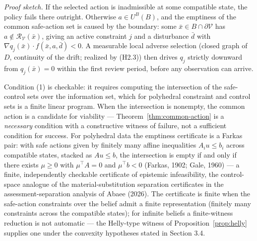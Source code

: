 \documentclass[10pt,twocolumn]{article}
\theoremstyle{definition}
\begin{document}
\emph{Proof sketch.} If the selected action is inadmissible at some compatible state, the policy fails there outright. Otherwise \(a \in U^B(B)\), and the emptiness of the common safe-action set is caused by the boundary: some \(\bar x \in B \cap \partial\mathcal{V}\) has \(a \notin \mathcal{R}_{\mathcal{V}}(\bar x)\), giving an active constraint \(j\) and a disturbance \(\bar d\) with \(\nabla q_j(\bar x) \cdot f(\bar x, a, \bar d) < 0\). A measurable local adverse selection (closed graph of \(D\), continuity of the drift; realized by (H2.3)) then drives \(q_j\) strictly downward from \(q_j(\bar x) = 0\) within the first review period, before any observation can arrive.

Condition (1) is checkable: it requires computing the intersection of
the safe-control sets over the information set, which for polyhedral
constraint and control sets is a finite linear program. When the
intersection is nonempty, the common action is a candidate for viability
--- Theorem~\ref{thm:common-action} is a \emph{necessary} condition with a constructive
witness of failure, not a sufficient condition for success. For
polyhedral data the emptiness certificate is a Farkas pair: with safe
actions given by finitely many affine inequalities \(A_i u \le b_i\)
across compatible states, stacked as \(A u \le b\), the intersection is
empty if and only if there exists \(\mu \ge 0\) with \(\mu^{\top} A = 0\) and \(\mu^{\top} b < 0\) (Farkas, 1902;
Gale, 1960) --- a finite, independently checkable certificate of
epistemic infeasibility, the control-space analogue of the material-substitution separation certificates in the assessment-separation analysis of Abaee (2026). The certificate
is finite when the safe-action constraints over the belief admit a finite
representation (finitely many constraints across the compatible states);
for infinite beliefs a finite-witness reduction is not automatic --- the
Helly-type witness of Proposition~\ref{prop:helly} supplies one under the
convexity hypotheses stated in Section 3.4.
\end{document}
